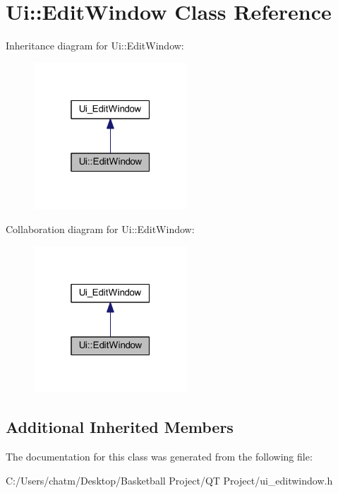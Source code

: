 \hypertarget{class_ui_1_1_edit_window}{}\section{Ui\+::Edit\+Window Class Reference}
\label{class_ui_1_1_edit_window}


Inheritance diagram for Ui\+::Edit\+Window\+:\nopagebreak
\begin{figure}[H]
\begin{center}
\leavevmode
\includegraphics[width=163pt]{class_ui_1_1_edit_window__inherit__graph}
\end{center}
\end{figure}


Collaboration diagram for Ui\+::Edit\+Window\+:\nopagebreak
\begin{figure}[H]
\begin{center}
\leavevmode
\includegraphics[width=163pt]{class_ui_1_1_edit_window__coll__graph}
\end{center}
\end{figure}
\subsection*{Additional Inherited Members}


The documentation for this class was generated from the following file\+:\begin{DoxyCompactItemize}
\item 
C\+:/\+Users/chatm/\+Desktop/\+Basketball Project/\+Q\+T Project/ui\+\_\+editwindow.\+h\end{DoxyCompactItemize}

